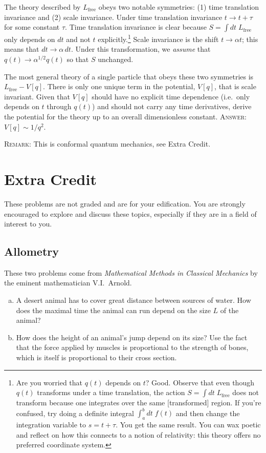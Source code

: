 \documentclass[12pt]{article}
\numberwithin{equation}{section}    %
\begin{document}
The theory described by $L_\text{free}$ obeys two notable symmetries: (1) time translation invariance and (2) scale invariance. Under time translation invariance $t\to t+ \tau$ for some constant $\tau$. Time translation invariance is clear because $S = \int dt\; L_\text{free}$ only depends on $dt$ and not $t$ explicitly.\footnote{Are you worried that $q(t)$ depends on $t$? Good. Observe that even though $q(t)$ transforms under a time translation, the action $S = \int dt \; L_\text{free}$ does not transform because one integrates over the same [transformed] region. If you're confused, try doing a definite integral $\int_a^b dt\;f(t)$ and then change the integration variable to $s=t+\tau$. You get the same result. You can wax poetic and reflect on how this connects to a notion of relativity: this theory offers no preferred coordinate system.}  Scale invariance is the shift $t \to \alpha t$; this means that $dt\to \alpha\, dt$. Under this transformation, we \emph{assume} that $q(t) \to \alpha^{1/2} q(t)$ so that $S$ unchanged.

The most general theory of a single particle that obeys these two symmetries is $L_\text{free} - V[q]$. There is only one unique term in the potential, $V[q]$, that is scale invariant. Given that $V[q]$ should have no explicit time dependence (i.e.\ only depends on $t$ through $q(t)$) and should not carry any time derivatives, derive the potential for the theory up to an overall dimensionless constant. \textsc{Answer:} $V[q] \sim 1/q^2$. 

\textsc{Remark:} This is conformal quantum mechanics, see Extra Credit.

\section{Extra Credit}

These problems are not graded and are for your edification. You are strongly encouraged to explore and discuss these topics, especially if they are in a field of interest to you.

\subsection{Allometry}

These two problems come from \emph{Mathematical Methods in Classical Mechanics} by the eminent mathematician V.I.~Arnold. 

\begin{enumerate}[(a)]

\item A desert animal has to cover great distance between sources of water. How does the maximal time the animal can run depend on the size $L$ of the animal?

\item How does the height of an animal's jump depend on its size? Use the fact that the force applied by muscles is proportional to the strength of bones, which is itself is proportional to their cross section.

\end{enumerate}
\end{document}

